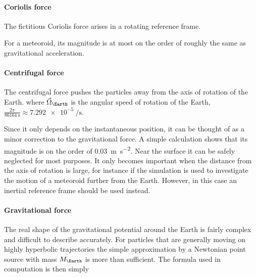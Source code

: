             \paragraph{Coriolis force} \label{saiC}
                The fictitious Coriolis force arises in a rotating reference frame.

                For a meteoroid, its magnitude is at most on the order of
                roughly the same as gravitational acceleration.

            \paragraph{Centrifugal force} \label{saic}
                The centrifugal force pushes the particles away from the axis of rotation of the Earth.
                where $\vec{\Omega}_\Earth$ is the angular speed of rotation of the Earth,
                $\frac{2\pi}{\SI{86164}{\second}} \approx \SI{7.292e-5}{\per\second}$.

                Since it only depends on the instantaneous position, it can be thought of as a minor correction to the
                gravitational force. A simple calculation shows that its magnitude is on the order
                of \SI{0.03}{\metre\per\second\squared}. Near the surface it can be safely neglected for most purposes.
                It only becomes important when the distance from the axis of rotation is large, for instance if the simulation
                is used to investigate the motion of a meteoroid further from the Earth.
                However, in this case an inertial reference frame should be used instead.

            \paragraph{Gravitational force} \label{saig}
                The real shape of the gravitational potential around the Earth is fairly complex and difficult to describe accurately.
                For particles that are generally moving on highly hyperbolic trajectories the
                simple approximation by a Newtonian point source with mass $M_\Earth$ is more than sufficient.
                The formula used in computation is then simply

